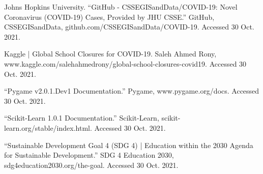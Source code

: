 \documentclass[fontsize=11pt]{article}
\begin{document}
Johns Hopkins University. “GitHub - CSSEGISandData/COVID-19: Novel Coronavirus (COVID-19) Cases, Provided by JHU CSSE.” GitHub, CSSEGISandData, github.com/CSSEGISandData/COVID-19. Accessed 30 Oct. 2021.

Kaggle | Global School Closures for COVID-19. Saleh Ahmed Rony, www.kaggle.com/salehahmedrony/global-school-closures-covid19. Accessed 30 Oct. 2021.

“Pygame v2.0.1.Dev1 Documentation.” Pygame, www.pygame.org/docs. Accessed 30 Oct. 2021.

“Scikit-Learn 1.0.1 Documentation.” Scikit-Learn, scikit-learn.org/stable/index.html. Accessed 30 Oct. 2021.

“Sustainable Development Goal 4 (SDG 4) | Education within the 2030 Agenda for Sustainable Development.” SDG 4 Education 2030, sdg4education2030.org/the-goal. Accessed 30 Oct. 2021.
\end{document}
